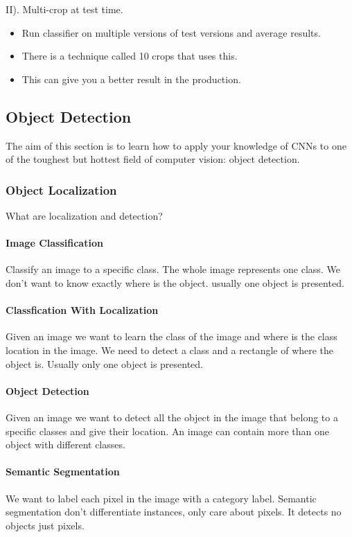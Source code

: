 II). Multi-crop at test time.
\begin{itemize}
    \item Run classifier on multiple versions of test versions and average results.
    \item There is a technique called 10 crops that uses this.
    \item This can give you a better result in the production.
\end{itemize}


\subsection{Object Detection}
The aim of this section is to learn how to apply your knowledge of CNNs to one of the toughest but hottest field of computer vision: object detection.

\subsubsection{Object Localization}
What are localization and detection?

\paragraph{Image Classification} Classify an image to a specific class. The whole image represents one class. We don't want to know exactly where is the object. usually one object is presented.

\paragraph{Classfication With Localization} Given an image we want to learn the class of the image and where is the class location in the image. We need to detect a class and a rectangle of where the object is. Usually only one object is presented.

\paragraph{Object Detection} Given an image we want to detect all the object in the image that belong to a specific classes and give their location. An image can contain more than one object with different classes.

\paragraph{Semantic Segmentation} We want to label each pixel in the image with a category label. Semantic segmentation don't differentiate instances, only care about pixels. It detects no objects just pixels.

